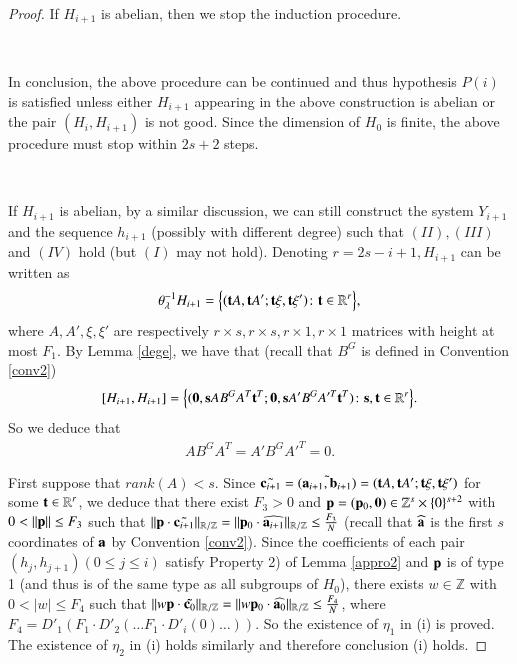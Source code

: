 \documentclass[12pt,amstex]{amsart}
\theoremstyle{definition}
\def \c {\bold{c}}
\def \a {\bold{a}}
\def \b {\bold{b}}
\def \p {\bold{p}}
\def \l {\bold{\lambda}}
\begin{document}
\begin{proof}
If $H_{i+1}$ is abelian, then we stop the induction procedure.

\

In conclusion, the above procedure can be continued and thus hypothesis $P(i)$ is satisfied unless either $H_{i+1}$ appearing in the above construction is abelian or the pair $(H_{i},H_{i+1})$ is not good. Since the dimension of $H_{0}$ is finite, the above procedure must stop within $2s+2$ steps.

\


If $H_{i+1}$ is abelian, by a similar discussion,
we can still construct the system $Y_{i+1}$ and the sequence $h_{i+1}$ (possibly with different degree) such that $(II),(III)$ and $(IV)$ hold (but $(I)$ may not hold). Denoting $r=2s-i+1, H_{i+1}$ can be written as
\begin{equation}\nonumber
 \begin{split}
  \theta_{\l}^{-1}H_{i+1}=\Bigl\{ (\bold{t}A,\bold{t}A';\bold{t}\xi,\bold{t}\xi')\colon\bold{t}\in\mathbb{R}^{r}\Bigr\},
 \end{split}
\end{equation}
where $A,A',\xi,\xi'$ are respectively $r\times s, r\times s, r\times 1, r\times 1$ matrices with height at most $F_{1}$.
By Lemma \ref{dege}, we have that (recall that $B^{G}$ is defined in Convention \ref{conv2})
\begin{equation}\nonumber
 \begin{split}
  [H_{i+1},H_{i+1}]=\Bigl\{ (\bold{0},\bold{s}AB^{G}A^{T}\bold{t}^{T};\bold{0},\bold{s}A'B^{G}A'^{T}\bold{t}^{T})\colon\bold{s},\bold{t}\in\mathbb{R}^{r}\Bigr\}.
 \end{split}
\end{equation}
So we deduce that
\begin{equation}\label{ABA2}
 \begin{split}
  AB^{G}A^{T}=A'B^{G}A'^{T}=0.
 \end{split}
\end{equation}

First suppose that $rank(A)<s$. Since $\tilde{\c_{i+1}}=\tilde{(\a_{i+1},\b_{i+1})}=(\bold{t}A,\bold{t}A';\bold{t}\xi,\bold{t}\xi')$ for some $\bold{t}\in\mathbb{R}^{r}$, we deduce that there exist $F_{3}>0$ and $\p=(\p_{0},\bold{0})\in\mathbb{Z}^{s}\times\{0\}^{s+2}$ with $0<\Vert\p\Vert\leq F_{3}$ such that
$\Vert\p\cdot\tilde{\c_{i+1}}\Vert_{\mathbb{R}/\mathbb{Z}}=\Vert\p_{0}\cdot\widehat{\a_{i+1}}\Vert_{\mathbb{R}/\mathbb{Z}}\leq\frac{F_{3}}{N}$ (recall that
$\widehat{\a}$ is the first $s$ coordinates of $\a$ by Convention \ref{conv2}).
Since the coefficients of each pair $(h_{j},h_{j+1}) (0\leq j\leq i)$ satisfy Property 2) of Lemma \ref{appro2} and $\p$ is of type 1 (and thus is of the same type
as all subgroups of $H_{0}$), there exists $w\in\mathbb{Z}$ with $0<\vert w\vert\leq F_{4}$ such that
$\Vert w\p\cdot\tilde{\c_{0}}\Vert_{\mathbb{R}/\mathbb{Z}}=\Vert w\p_{0}\cdot\widehat{\a_{0}}\Vert_{\mathbb{R}/\mathbb{Z}}\leq\frac{F_{4}}{N}$,
where $F_{4}=D'_{1}(F_{1}\cdot D'_{2}(\dots F_{1}\cdot D'_{i}(0)\dots))$. So the existence of $\eta_{1}$ in (i) is proved.
The existence of $\eta_{2}$ in (i) holds similarly and therefore conclusion (i) holds.


\end{proof}
\end{document}
